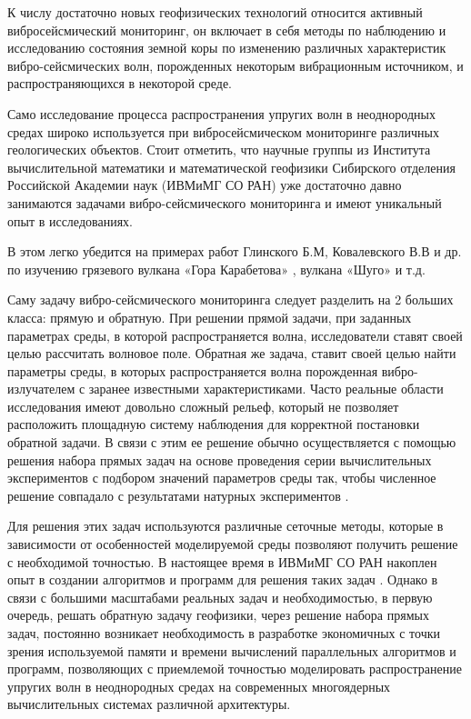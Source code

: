 
К числу достаточно новых геофизических технологий относится активный вибросейсмический мониторинг, 
он включает в себя методы по наблюдению и исследованию состояния земной коры по изменению 
различных характеристик вибро-сейсмических волн, порожденных некоторым вибрационным источником, 
и распространяющихся в некоторой среде. 

Само исследование процесса распространения упругих волн в неоднородных средах широко
используется при вибросейсмическом мониторинге различных геологических объектов.
Стоит отметить, что научные группы из Института
вычислительной математики и математической геофизики Сибирского
отделения Российской Академии наук (ИВМиМГ СО РАН) уже достаточно давно занимаются
задачами вибро-сейсмического мониторинга и имеют уникальный опыт в исследованиях.

В этом легко убедится на примерах работ Глинского Б.М, Ковалевского В.В и др.
по изучению грязевого вулкана «Гора Карабетова» \cite{glisnkiy-karabetov}, вулкана «Шуго» {} и т.д.

Саму задачу вибро-сейсмического мониторинга следует разделить на 2 больших класса: прямую и обратную.
При решении прямой задачи, при заданных параметрах среды, в которой распространяется волна, 
исследователи ставят своей целью рассчитать волновое поле. Обратная же задача, ставит своей целью найти параметры среды, 
в которых распространяется волна порожденная вибро-излучателем с заранее известными характеристиками. Часто реальные области исследования имеют довольно сложный рельеф,
который не позволяет расположить площадную систему наблюдения для корректной постановки обратной задачи. В связи с этим ее решение
обычно осуществляется с помощью решения набора прямых задач на основе проведения серии вычислительных
экспериментов с подбором значений параметров среды так, чтобы численное решение совпадало с результатами натурных экспериментов .

Для решения этих задач используются различные сеточные методы,  которые в зависимости от особенностей моделируемой среды позволяют получить решение с необходимой точностью.
В настоящее время в ИВМиМГ СО РАН накоплен опыт в создании алгоритмов и программ для решения таких задач \cite{konov, mih, ter, fat}.
Однако в связи с большими масштабами реальных задач и необходимостью, в первую очередь, решать обратную
задачу геофизики, через решение набора прямых задач, постоянно возникает необходимость в
разработке экономичных с точки зрения используемой памяти и времени вычислений
параллельных алгоритмов и программ, позволяющих с приемлемой точностью
моделировать распространение упругих волн в неоднородных средах на 
современных многоядерных вычислительных системах различной архитектуры.

